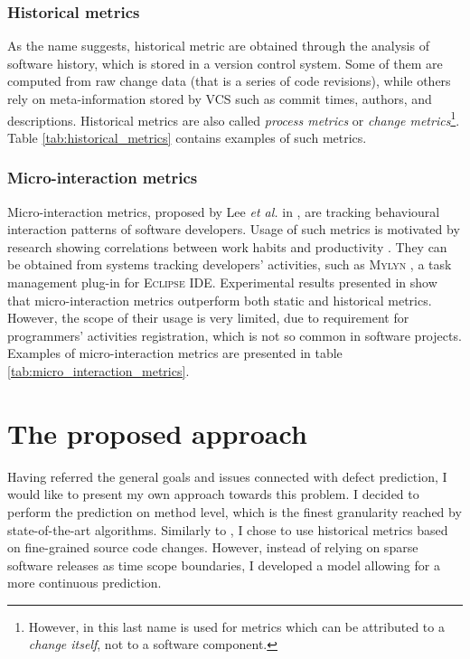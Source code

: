 \documentclass{pracamgr}
\begin{document}

\subsection{Historical metrics}
\label{sec:historical}
As the name suggests, historical metric are obtained through the analysis of software history, which is stored in a version control system. Some of them are computed from raw change data (that is a series of code revisions), while others rely on meta-information stored by VCS such as commit times, authors, and descriptions. Historical metrics are also called \emph{process metrics} or \emph{change metrics}\footnote{However, in \cite{Fukushima} this last name is used for metrics which can be attributed to a \textit{change itself}, not to a software component.}. Table \ref{tab:historical_metrics} contains examples of such metrics.


\subsection{Micro-interaction metrics}
\label{sec:micro-interaction}
Micro-interaction metrics, proposed by Lee \textit{et al.} in \cite{micro_interaction}, are tracking behavioural interaction patterns of software developers. Usage of such metrics is motivated by research showing correlations between work habits and productivity \cite{LaToza}. They can be obtained from systems tracking developers' activities, such as \textsc{Mylyn} \cite{mylyn}, a task management plug-in for \textsc{Eclipse IDE}. Experimental results presented in \cite{micro_interaction} show that micro-interaction metrics outperform both static and historical metrics. However, the scope of their usage is very limited, due to requirement for programmers' activities registration, which is not so common in software projects. Examples of micro-interaction metrics are presented in table \ref{tab:micro_interaction_metrics}.


\chapter{The proposed approach}
\label{cha:approach}
Having referred the general goals and issues connected with defect prediction, I would like to present my own approach towards this problem. I decided to perform the prediction on method level, which is the finest granularity reached by state-of-the-art algorithms. Similarly to \cite{method-level}, I chose to use historical metrics based on fine-grained source code changes. However, instead of relying on sparse software releases as time scope boundaries, I developed a model allowing for a more continuous prediction.
\end{document}
